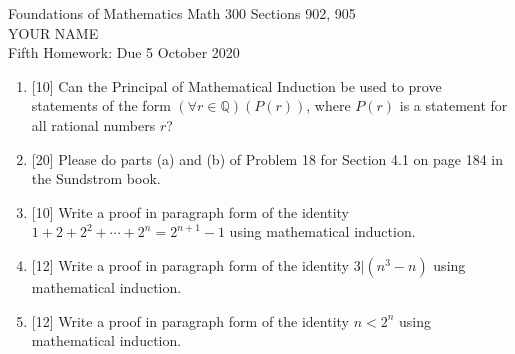 \documentclass[12pt]{article}
\begin{document}
\LARGE 
\noindent
{\color{Maroon}Foundations of Mathematics \hfill Math 300 Sections 902, 905}\vspace{2pt}\\
\Large YOUR NAME\vspace{2pt}\\
\large
Fifth Homework: \hfill Due 5 October 2020
\normalsize    %
\vspace{10pt}  %

\noindent{\color{blue}\rule{500pt}{2pt}}

  
\begin{enumerate}

\item{[10]} Can the Principal of Mathematical Induction be used to prove statements of the form
    $(\forall r \in{\mathbb Q}) (P(r))$, where $P(r)$ is a statement for all rational numbers $r$?


\item{[20]} Please do parts (a) and (b) of Problem 18 for Section 4.1  on page 184 in the Sundstrom book.

\item{[10]} Write a proof in paragraph form of the identity  
       $1+2+2^2+\dotsb+2^n=2^{n+1}-1$
       using mathematical induction.
 
\item{[12]} Write a proof in paragraph form of the identity  
  $3|(n^3-n)$ 
       using mathematical induction.

\item{[12]} Write a proof in paragraph form of the identity  
  $n<2^n$  
       using mathematical induction.


\end{enumerate}
\end{document}
